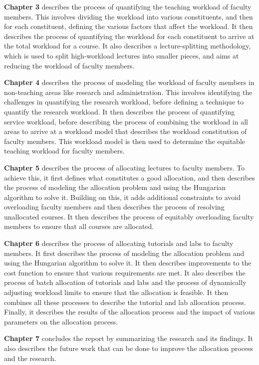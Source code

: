 \textbf{Chapter 3} describes the process of quantifying the teaching workload of faculty members. This involves dividing the workload into various constituents, and then for each constituent, defining the various factors that affect the workload. It then describes the process of quantifying the workload for each constituent to arrive at the total workload for a course. It also describes a lecture-splitting methodology, which is used to split high-workload lectures into smaller pieces, and aims at reducing the workload of faculty members.

\textbf{Chapter 4} describes the process of modeling the workload of faculty members in non-teaching areas like research and administration. This involves identifying the challenges in quantifying the research workload, before defining a technique to quantify the research workload. It then describes the process of quantifying service workload, before describing the process of combining the workload in all areas to arrive at a workload model that describes the workload constitution of faculty members. This workload model is then used to determine the equitable teaching workload for faculty members.

\textbf{Chapter 5} describes the process of allocating lectures to faculty members. To achieve this, it first defines what constitutes a good allocation, and then describes the process of modeling the allocation problem and using the Hungarian algorithm to solve it. Building on this, it adds additional constraints to avoid overloading faculty members and then describes the process of resolving unallocated courses. It then describes the process of equitably overloading faculty members to ensure that all courses are allocated.

\textbf{Chapter 6} describes the process of allocating tutorials and labs to faculty members. It first describes the process of modeling the allocation problem and using the Hungarian algorithm to solve it. It then describes improvements to the cost function to ensure that various requirements are met. It also describes the process of batch allocation of tutorials and labs and the process of dynamically adjusting workload limits to ensure that the allocation is feasible. It then combines all these processes to describe the tutorial and lab allocation process. Finally, it describes the results of the allocation process and the impact of various parameters on the allocation process.

\textbf{Chapter 7} concludes the report by summarizing the research and its findings. It also describes the future work that can be done to improve the allocation process and the research.
